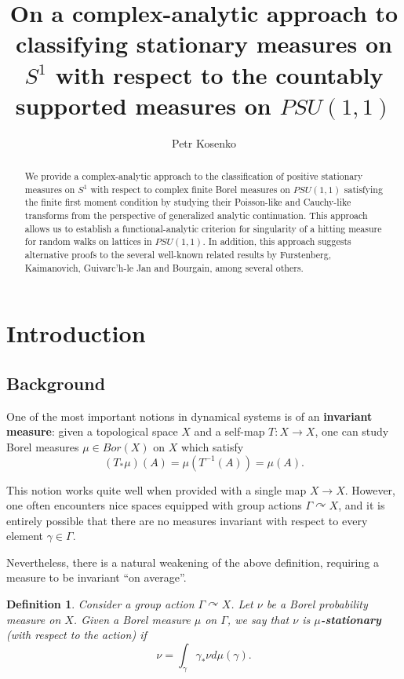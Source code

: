\documentclass[11pt]{article}
\author{Petr Kosenko}
\title{On a complex-analytic approach to classifying stationary measures on $S^1$ with respect to the countably supported measures on $PSU(1,1)$}
\newtheorem{definition}{Definition}[section]
\begin{document}
\maketitle

\begin{abstract}
We provide a complex-analytic approach to the classification of positive stationary measures on $S^1$ with respect to complex finite Borel measures on $PSU(1,1)$ satisfying the finite first moment condition by studying their Poisson-like and Cauchy-like transforms from the perspective of generalized analytic continuation. This approach allows us to establish a functional-analytic criterion for singularity of a hitting measure for random walks on lattices in $PSU(1,1)$. In addition, this approach suggests alternative proofs to the several well-known related results by Furstenberg, Kaimanovich, Guivarc'h-le Jan and Bourgain, among several others.
\end{abstract}

\section{Introduction}

\subsection{Background}

One of the most important notions in dynamical systems is of an \textbf{invariant measure}: given a topological space $X$ and a self-map $T : X \rightarrow X$, one can study Borel measures $\mu \in Bor(X)$ on $X$ which satisfy
\begin{equation}
	(T_* \mu)(A) = \mu(T^{-1}(A)) = \mu(A).
\end{equation}

This notion works quite well when provided with a single map $X \rightarrow X$. However, one often encounters nice spaces equipped with group actions $\Gamma \curvearrowright X$, and it is entirely possible that there are no measures invariant with respect to every element $\gamma \in \Gamma$.

Nevertheless, there is a natural weakening of the above definition, requiring a measure to be invariant ``on average''.

\begin{definition}
	Consider a group action $\Gamma \curvearrowright X$. Let $\nu$ be a Borel probability measure on $X$. Given a Borel measure $\mu$ on $\Gamma$, we say that $\nu$ is \textbf{$\mu$-stationary} (with respect to the action) if
	\begin{equation}
		\label{intro: stationary measure}
		\nu = \int_\gamma  \gamma_* \nu d \mu(\gamma).
	\end{equation}
\end{definition}
\end{document}
